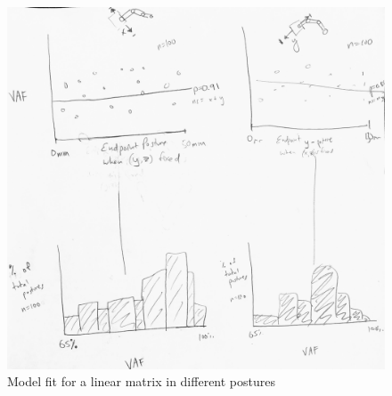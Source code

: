 \documentclass[utf8]{frontiersSCNS} %
\begin{document}
\begin{figure}[h!]
\begin{center}
\includegraphics[width=15cm]{figures/model_fit/model_fit.jpg}%
\end{center}
\caption{Model fit for a linear matrix in different postures}
\label{fig:model_fit}
\end{figure}
\end{document}
